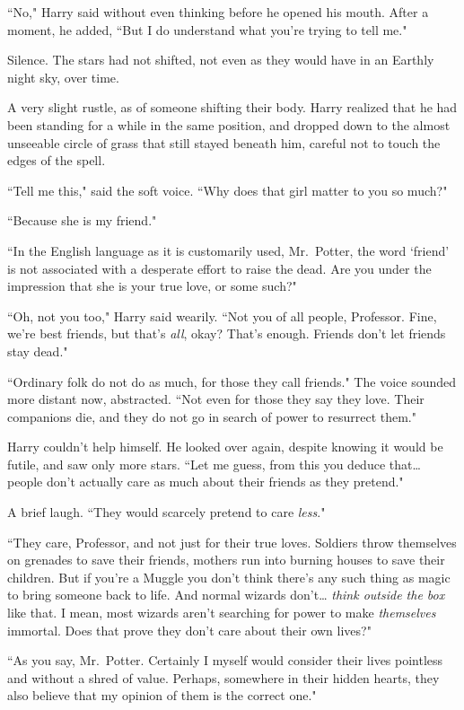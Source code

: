 ``No," Harry said without even thinking before he opened his mouth. After a moment, he added, ``But I do understand what you're trying to tell me."

Silence. The stars had not shifted, not even as they would have in an Earthly night sky, over time.

A very slight rustle, as of someone shifting their body. Harry realized that he had been standing for a while in the same position, and dropped down to the almost unseeable circle of grass that still stayed beneath him, careful not to touch the edges of the spell.

``Tell me this," said the soft voice. ``Why does that girl matter to you so much?"

``Because she is my friend."

``In the English language as it is customarily used, Mr.~Potter, the word `friend' is not associated with a desperate effort to raise the dead. Are you under the impression that she is your true love, or some such?"

``Oh, not you too," Harry said wearily. ``Not you of all people, Professor. Fine, we're best friends, but that's \emph{all}, okay? That's enough. Friends don't let friends stay dead."

``Ordinary folk do not do as much, for those they call friends." The voice sounded more distant now, abstracted. ``Not even for those they say they love. Their companions die, and they do not go in search of power to resurrect them."

Harry couldn't help himself. He looked over again, despite knowing it would be futile, and saw only more stars. ``Let me guess, from this you deduce that{\ldots} people don't actually care as much about their friends as they pretend."

A brief laugh. ``They would scarcely pretend to care \emph{less}."

``They care, Professor, and not just for their true loves. Soldiers throw themselves on grenades to save their friends, mothers run into burning houses to save their children. But if you're a Muggle you don't think there's any such thing as magic to bring someone back to life. And normal wizards don't{\ldots} \emph{think outside the box} like that. I mean, most wizards aren't searching for power to make \emph{themselves} immortal. Does that prove they don't care about their own lives?"

``As you say, Mr.~Potter. Certainly I myself would consider their lives pointless and without a shred of value. Perhaps, somewhere in their hidden hearts, they also believe that my opinion of them is the correct one."

